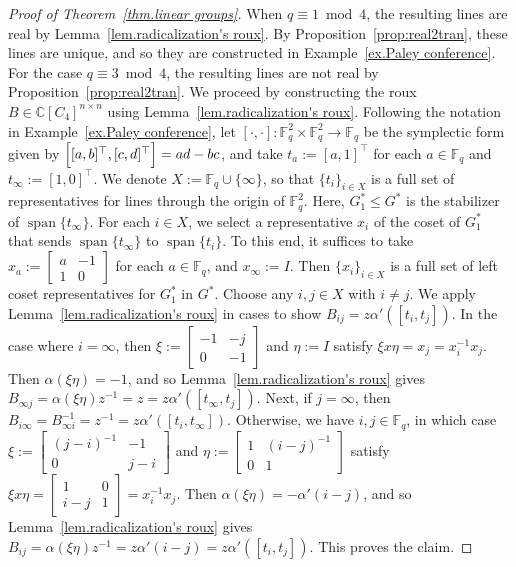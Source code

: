\documentclass[11pt]{article}
\theoremstyle{definition}
\numberwithin{equation}{section}
\begin{document}
\begin{proof}[Proof of Theorem~\ref{thm.linear groups}]
When $q\equiv1\bmod4$, the resulting lines are real by Lemma~\ref{lem.radicalization's roux}.
By Proposition~\ref{prop:real2tran}, these lines are unique, and so they are constructed in Example~\ref{ex.Paley conference}.
For the case $q\equiv3\bmod4$, the resulting lines are not real by Proposition~\ref{prop:real2tran}.
We proceed by constructing the roux $B\in\mathbb{C}[C_4]^{n\times n}$ using Lemma~\ref{lem.radicalization's roux}.
Following the notation in Example~\ref{ex.Paley conference}, let $[\cdot,\cdot] : \mathbb{F}_q^2 \times \mathbb{F}_q^2 \to \mathbb{F}_q$ be the symplectic form given by $\Bigl[ [ a,b]^\top, [c,d]^\top \Bigr] = ad - bc$, and take $t_a:=[a,1]^\top$ for each $a\in\mathbb{F}_q$ and $t_\infty:=[1,0]^\top$.
We denote $X:=\mathbb{F}_q \cup \{ \infty \}$, so that $\{ t_i \}_{i \in X}$ is a full set of representatives for lines through the origin of $\mathbb{F}_q^2$.
Here, $G^*_1\leq G^*$ is the stabilizer of $\operatorname{span}\{t_\infty\}$.
For each $i\in X$, we select a representative $x_i$ of the coset of $G^*_1$ that sends $\operatorname{span}\{t_\infty\}$ to $\operatorname{span}\{t_i\}$.
To this end, it suffices to take $x_a:=\left[\begin{array}{cc}a&-1\\1&0\end{array}\right]$ for each $a\in\mathbb{F}_q$, and $x_\infty:=I$.
Then  $\{x_i\}_{i\in X}$ is a full set of left coset representatives for $G^*_1$ in $G^*$.
Choose any $i,j\in X$ with $i\neq j$.
We apply Lemma~\ref{lem.radicalization's roux} in cases to show $B_{ij} = z \alpha'([t_i,t_j])$.
In the case where $i=\infty$, then $\xi:=\left[\begin{array}{cc}-1&-j\\0&-1\end{array}\right]$ and $\eta:=I$ satisfy $\xi x \eta = x_j = x_i^{-1}x_j$.
Then $\alpha(\xi \eta) = -1$, and so Lemma~\ref{lem.radicalization's roux} gives $B_{\infty j}=\alpha(\xi\eta)z^{-1}=z = z \alpha'([t_\infty, t_j])$.
Next, if $j=\infty$, then $B_{i\infty}=B_{\infty i}^{-1}=z^{-1} = z \alpha'([t_i, t_\infty])$.
Otherwise, we have $i,j\in\mathbb{F}_q$, in which case $\xi:=\left[\begin{array}{cc}(j-i)^{-1}&-1\\0&j-i\end{array}\right]$ and $\eta:=\left[\begin{array}{cc}1&(i-j)^{-1}\\0&1\end{array}\right]$ satisfy $\xi x \eta = \left[\begin{array}{cc}1&0\\i-j&1\end{array}\right] = x_i^{-1}x_j$.
Then $\alpha(\xi\eta)=-\alpha'(i-j)$, and so Lemma~\ref{lem.radicalization's roux} gives $B_{ij}=\alpha(\xi\eta)z^{-1}=z\alpha'(i-j)=z\alpha'([t_i,t_j])$.
This proves the claim.


\end{proof}
\end{document}
